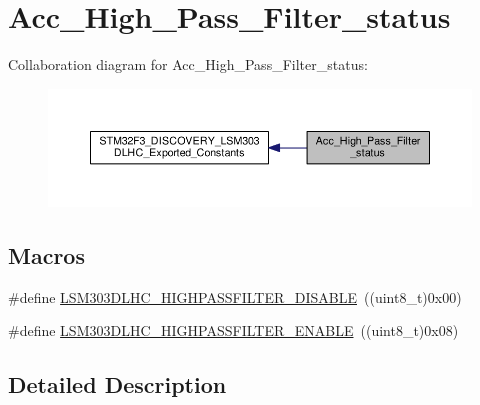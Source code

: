 \hypertarget{group__Acc__High__Pass__Filter__status}{\section{Acc\+\_\+\+High\+\_\+\+Pass\+\_\+\+Filter\+\_\+status}
\label{group__Acc__High__Pass__Filter__status}
}
Collaboration diagram for Acc\+\_\+\+High\+\_\+\+Pass\+\_\+\+Filter\+\_\+status\+:\nopagebreak
\begin{figure}[H]
\begin{center}
\leavevmode
\includegraphics[width=350pt]{group__Acc__High__Pass__Filter__status}
\end{center}
\end{figure}
\subsection*{Macros}
\begin{DoxyCompactItemize}
\item 
\#define \hyperlink{group__Acc__High__Pass__Filter__status_ga694f040af7e45343fcd428b294d348ab}{L\+S\+M303\+D\+L\+H\+C\+\_\+\+H\+I\+G\+H\+P\+A\+S\+S\+F\+I\+L\+T\+E\+R\+\_\+\+D\+I\+S\+A\+B\+L\+E}~((uint8\+\_\+t)0x00)
\item 
\#define \hyperlink{group__Acc__High__Pass__Filter__status_gaa06f83717a2f23ab3473d4c28ba6d4e2}{L\+S\+M303\+D\+L\+H\+C\+\_\+\+H\+I\+G\+H\+P\+A\+S\+S\+F\+I\+L\+T\+E\+R\+\_\+\+E\+N\+A\+B\+L\+E}~((uint8\+\_\+t)0x08)
\end{DoxyCompactItemize}


\subsection{Detailed Description}



